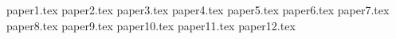 {paper1.tex}
{paper2.tex}
{paper3.tex}
{paper4.tex}
{paper5.tex}
{paper6.tex}
{paper7.tex}
{paper8.tex}
{paper9.tex}
{paper10.tex}
{paper11.tex}
{paper12.tex}
